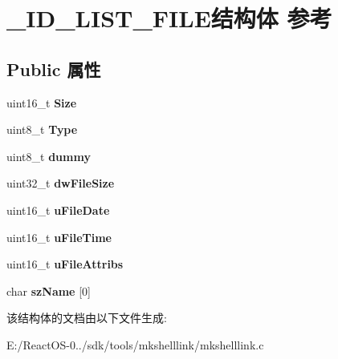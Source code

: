 \hypertarget{struct___i_d___l_i_s_t___f_i_l_e}{}\section{\+\_\+\+I\+D\+\_\+\+L\+I\+S\+T\+\_\+\+F\+I\+L\+E结构体 参考}
\label{struct___i_d___l_i_s_t___f_i_l_e}
\subsection*{Public 属性}
\begin{DoxyCompactItemize}
\item 
\mbox{\label{struct___i_d___l_i_s_t___f_i_l_e_af3fbbc68c831dc41381a3818236ac382}} 
uint16\+\_\+t {\bfseries Size}
\item 
\mbox{\label{struct___i_d___l_i_s_t___f_i_l_e_a8149e81ea7b44702be888064338ff374}} 
uint8\+\_\+t {\bfseries Type}
\item 
\mbox{\label{struct___i_d___l_i_s_t___f_i_l_e_abc55521d0941cf094093ae272726b581}} 
uint8\+\_\+t {\bfseries dummy}
\item 
\mbox{\label{struct___i_d___l_i_s_t___f_i_l_e_a7803c0ed0687c589c05ed73ec4fa140b}} 
uint32\+\_\+t {\bfseries dw\+File\+Size}
\item 
\mbox{\label{struct___i_d___l_i_s_t___f_i_l_e_a5e48f0ea3847d7751ce3aa775bd97537}} 
uint16\+\_\+t {\bfseries u\+File\+Date}
\item 
\mbox{\label{struct___i_d___l_i_s_t___f_i_l_e_a85d81796132211789c3f9b2937d6c024}} 
uint16\+\_\+t {\bfseries u\+File\+Time}
\item 
\mbox{\label{struct___i_d___l_i_s_t___f_i_l_e_af67fb1a9695f8fc9ed13c918a96915e4}} 
uint16\+\_\+t {\bfseries u\+File\+Attribs}
\item 
\mbox{\label{struct___i_d___l_i_s_t___f_i_l_e_a2db2cf259287ea62429b09573dd928de}} 
char {\bfseries sz\+Name} \mbox{[}0\mbox{]}
\end{DoxyCompactItemize}


该结构体的文档由以下文件生成\+:\begin{DoxyCompactItemize}
\item 
E\+:/\+React\+O\+S-\/0../sdk/tools/mkshelllink/mkshelllink.\+c\end{DoxyCompactItemize}

